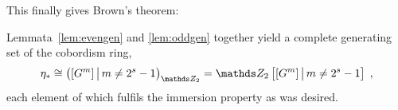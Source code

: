 This finally gives Brown's theorem:
\begin{Thm}
  Lemmata~\ref{lem:evengen} and \ref{lem:oddgen} together yield a
  complete generating set of the cobordism ring, \idest
  \begin{gather*}
    \c_*\cong \left( [\G m] \,\big|\, m\neq 2^s-1 \right)_{\Zmod2}
    = \Zmod2\left[[\G m] \,\big|\, m\neq 2^s-1\right]
    \;,
  \end{gather*}
  each element of which fulfils the immersion property as was
  desired.
\end{Thm}


